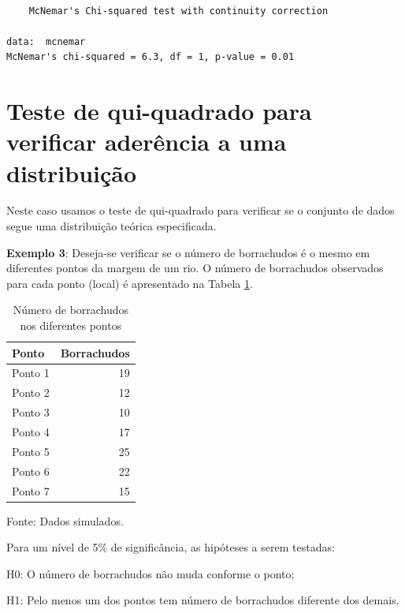 \documentclass[12pt,brazil,oneside]{book}
\newenvironment{Shaded}{\begin{snugshade}}{\end{snugshade}}
\newcommand{\DecValTok}[1]{\textcolor[rgb]{0.00,0.00,0.81}{#1}}
\newcommand{\KeywordTok}[1]{\textcolor[rgb]{0.13,0.29,0.53}{\textbf{#1}}}
\newcommand{\NormalTok}[1]{#1}
\newcommand{\OperatorTok}[1]{\textcolor[rgb]{0.81,0.36,0.00}{\textbf{#1}}}
\begin{document}
\begin{verbatim}

    McNemar's Chi-squared test with continuity correction

data:  mcnemar
McNemar's chi-squared = 6.3, df = 1, p-value = 0.01
\end{verbatim}

\hypertarget{teste-de-qui-quadrado-para-verificar-aderencia-a-uma-distribuicao}{%
\section{Teste de qui-quadrado para verificar aderência a uma
distribuição}\label{teste-de-qui-quadrado-para-verificar-aderencia-a-uma-distribuicao}}

Neste caso usamos o teste de qui-quadrado para verificar se o conjunto
de dados segue uma distribuição teórica especificada.

\textbf{Exemplo 3}: Deseja-se verificar se o número de borrachudos é o
mesmo em diferentes pontos da margem de um rio. O número de borrachudos
observados para cada ponto (local) é apresentado na Tabela
\ref{tab:borrach}.

\begin{table}

\caption{\label{tab:borrach}Número de borrachudos nos diferentes pontos}
\centering
\begin{tabular}[t]{l|r}
\hline
Ponto & Borrachudos\\
\hline
Ponto 1 & 19\\
\hline
Ponto 2 & 12\\
\hline
Ponto 3 & 10\\
\hline
Ponto 4 & 17\\
\hline
Ponto 5 & 25\\
\hline
Ponto 6 & 22\\
\hline
Ponto 7 & 15\\
\hline
\end{tabular}
\end{table}

Fonte: Dados simulados.

Para um nível de 5\% de significância, as hipóteses a serem testadas:

H0: O número de borrachudos não muda conforme o ponto;

H1: Pelo menos um dos pontos tem número de borrachudos diferente dos
demais.

\begin{Shaded}
\end{Shaded}
\end{document}
